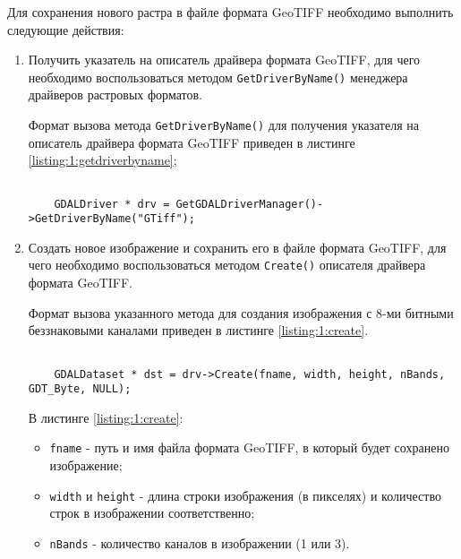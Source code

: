 Для сохранения нового растра в файле формата GeoTIFF необходимо выполнить следующие действия:

\begin{enumerate}

	\item Получить указатель на описатель драйвера формата GeoTIFF, для чего необходимо воспользоваться методом \verb|GetDriverByName()| менеджера драйверов растровых форматов.
		
	Формат вызова метода \verb|GetDriverByName()| для получения указателя на описатель драйвера формата GeoTIFF приведен в листинге \ref{listing:1:getdriverbyname};

	\begin{lstlisting}

	GDALDriver * drv = GetGDALDriverManager()->GetDriverByName("GTiff");

	\end{lstlisting}
	\mylistingend

	\item Создать новое изображение и сохранить его в файле формата GeoTIFF, для чего необходимо воспользоваться методом \verb|Create()| описателя драйвера формата GeoTIFF.

	Формат вызова указанного метода для создания изображения с 8-ми битными беззнаковыми каналами приведен в листинге \ref{listing:1:create}.

	\begin{lstlisting}

	GDALDataset * dst = drv->Create(fname, width, height, nBands, GDT_Byte, NULL);

	\end{lstlisting}
	\mylistingend

	В листинге \ref{listing:1:create}:

	\begin{itemize}

		\item \verb|fname| - путь и имя файла формата GeoTIFF, в который будет сохранено изображение;
		\item \verb|width| и \verb|height| - длина строки изображения (в пикселях) и количество строк в изображении соответственно;
		\item \verb|nBands| - количество каналов в изображении (1 или 3).


\end{itemize}
\end{enumerate}
